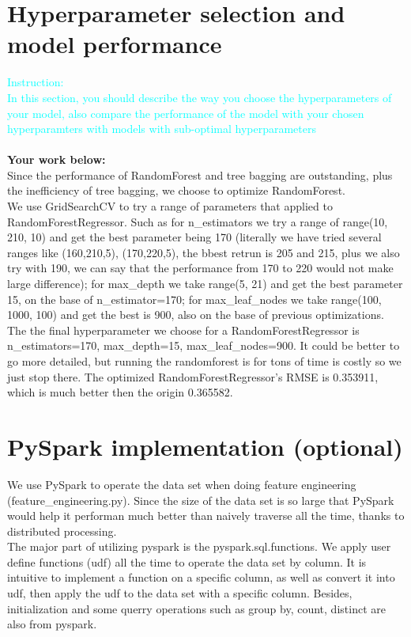 \documentclass{article}
\begin{document}
\section{Hyperparameter selection and model performance}
\textcolor{cyan}{Instruction: \\
  In this section, you should describe the way you choose the hyperparameters of your model, also compare the performance of the model with your chosen hyperparamters with models with sub-optimal hyperparameters}\\\\
\textbf{Your work below:}\\
Since the performance of RandomForest and tree bagging are outstanding, plus the inefficiency of tree bagging, we choose to optimize RandomForest.\\
We use GridSearchCV to try a range of parameters that applied to RandomForestRegressor. Such as for n\_estimators we try a range of range(10, 210, 10) and get the best parameter being 170 (literally we have tried several ranges like (160,210,5), (170,220,5), the bbest retrun is 205 and 215, plus we also try with 190, we can say that the performance from 170 to 220 would not make large difference); for max\_depth we take range(5, 21) and get the best parameter 15, on the base of n\_estimator=170; for max\_leaf\_nodes we take range(100, 1000, 100) and get the best is 900, also on the base of previous optimizations.\\
The the final hyperparameter we choose for a RandomForestRegressor is n\_estimators=170, max\_depth=15, max\_leaf\_nodes=900. It could be better to go more detailed, but running the randomforest is for tons of time is costly so we just stop there. The optimized RandomForestRegressor's RMSE is 0.353911, which is much better then the origin 0.365582.

\section{PySpark implementation (optional)}
We use PySpark to operate the data set when doing feature engineering (feature\_engineering.py). Since the size of the data set is so large that PySpark would help it performan much better than naively
traverse all the time, thanks to distributed processing.\\
The major part of utilizing pyspark is the pyspark.sql.functions. We apply user define functions (udf) all the time to operate the data set by column. It is intuitive to implement a function on a specific column, as well as convert it into udf, then apply the udf to the data set with a specific column. Besides, initialization and some querry operations such as group by, count, distinct are also from pyspark.
\end{document}
